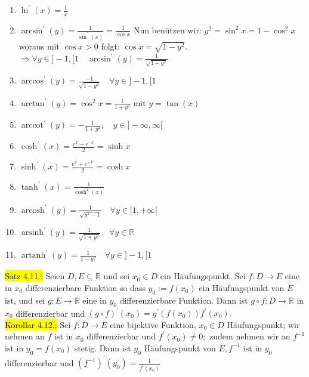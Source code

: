 \documentclass[10pt,landscape]{article}
\newcommand{\green}[1]{\sethlcolor{green}\hl{#1}}
\newcommand{\yellow}[1]{\sethlcolor{yellow} \hl{#1}}
\begin{document}
\begin{multicols}{3}
\begin{enumerate}
        \item $\ln ^{\prime}(x)=\frac{1}{x}$
        \item $\arcsin ^{\prime}(y)=\frac{1}{\sin ^{\prime}(x)}=\frac{1}{\cos x}$
        Nun benützen wir: $y^{2}=\sin ^{2} x=1-\cos ^{2} x$ woraus mit $\cos x>0$ folgt: $\cos x=\sqrt{1-y^{2}}$.
        $\Longrightarrow \forall y \in]-1,[1 \quad \arcsin ^{\prime}(y) =\frac{1}{\sqrt{1-y^{2}}}$
        \item $\arccos ^{\prime}(y)=\frac{-1}{\sqrt{1-y^{2}}} \quad \forall y \in]-1,[1$
        \item $\arctan ^{\prime}(y)=\cos ^{2} x=\frac{1}{1+y^{2}}$ mit $y = \tan (x)$
        \item $\operatorname{arccot}^{\prime}(y)=-\frac{1}{1+y^{2}}, \quad y \in]-\infty, \infty[$
        \item $\cosh ^{\prime}(x)=\frac{e^{x}-e^{-x}}{2}=\sinh x$
        \item $\sinh ^{\prime}(x)=\frac{e^{x}+e^{-x}}{2}=\cosh x$     
        \item $\tanh ^{\prime}(x)=\frac{1}{\cosh ^{2}(x)}$
        \item $\operatorname{arcosh}^{\prime}(y)=\frac{1}{\sqrt{y^{2}-1}} \quad \forall y \in] 1,+\infty[$
        \item $\operatorname{arsinh}^{\prime}(y)=\frac{1}{\sqrt{1+y^{2}}} \quad \forall y \in \mathbb{R}$
        \item $\operatorname{artanh}^{\prime}(y)=\frac{1}{1-y^{2}} \quad \forall y \in]-1,[1$
\end{enumerate}
\yellow{Satz 4.11.:} Seien $D, E \subseteq \mathbb{R}$ und sei $x_{0} \in D$ ein Häufungspunkt. Sei $f: D \longrightarrow E$ eine in $x_{0}$ differenzierbare Funktion so dass $y_{0}:=f\left(x_{0}\right)$ ein Häufungspunkt von $E$ ist, und sei $g: E \longrightarrow \mathbb{R}$ eine in $y_{0}$ differenzierbare Funktion. Dann ist $g \circ f: D \longrightarrow \mathbb{R}$ in $x_{0}$ differenzierbar und
$(g \circ f)^{\prime}\left(x_{0}\right)=g^{\prime}\left(f\left(x_{0}\right)\right) f^{\prime}\left(x_{0}\right).$\\
\green{Korollar 4.12.:} Sei $f: D \longrightarrow E$ eine bijektive Funktion, $x_{0} \in D$ Häufungspunkt; wir nehmen an $f$ ist in $x_{0}$ differenzierbar und $f^{\prime}\left(x_{0}\right) \neq 0 ;$ zudem nehmen wir an $f^{-1}$ ist in $y_{0}=f\left(x_{0}\right)$ stetig. Dann ist $y_{0}$ Häufungspunkt von $E, f^{-1}$ ist in $y_{0}$ differenzierbar und
$\left(f^{-1}\right)^{\prime}\left(y_{0}\right)=\frac{1}{f^{\prime}\left(x_{0}\right)}$

\end{multicols}
\end{document}

